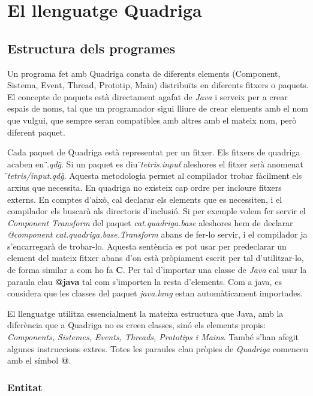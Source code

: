 \chapter{El llenguatge Quadriga}
\label{chap:llenguatgeQ}

\section{Estructura dels programes}

Un programa fet amb Quadriga consta de diferents elements (Component, Sistema, Event, Thread, Prototip, Main) distribuïts en diferents fitxers o paquets. El concepte de paquets està directament agafat de {\em Java} i serveix per a crear espais de noms, tal que un programador sigui lliure de crear elements amb el nom que vulgui, que sempre seran compatibles amb altres amb el mateix nom, però diferent paquet.

Cada paquet de Quadriga està representat per un fitxer. Els fitxers de quadriga acaben en {\em \"{}.qdg\"{}}. Si un paquet es diu {\em \"{}tetris.input\"{}} aleshores el fitxer serà anomenat {\em \"{}tetris/input.qdg\"{}}. Aquesta metodologia permet al compilador trobar fàcilment els arxius que necessita. En quadriga no existeix cap ordre per incloure fitxers externs. En comptes d'això, cal declarar els elements que es necessiten, i el compilador els buscarà als directoris d'inclusió. Si per exemple volem fer servir el {\em Component Transform} del paquet {\em cat.quadriga.base} aleshores hem de declarar {\em @component cat.quadriga.base.Transform} abans de fer-lo servir, i el compilador ja s'encarregarà de trobar-lo. Aquesta sentència es pot usar per predeclarar un element del mateix fitxer abans d'on està pròpiament escrit per tal d'utilitzar-lo, de forma similar a com ho fa {\bf C}. Per tal d'importar una classe de {\em Java} cal usar la paraula clau {\bf @java} tal com s'importen la resta d'elements. Com a java, es considera que les classes del paquet {\em java.lang} estan automàticament importades.

El llenguatge utilitza essencialment la mateixa estructura que Java, amb la diferència que a Quadriga no es creen classes, sinó els elements propis: {\em Components, Sistemes, Events, Threads, Prototips i Mains}. També s'han afegit algunes instruccions extres. Totes les paraules clau pròpies de {\em Quadriga} comencen amb el símbol {\bf @}.

\subsection{Entitat}

